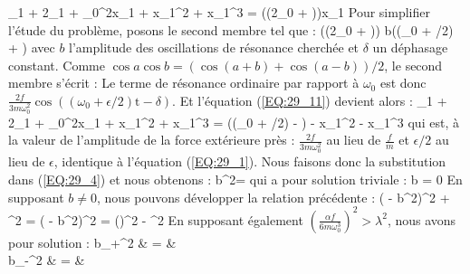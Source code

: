 \be
	_{1} + 2\lambda{}_{1} + \omega_{0}^{2}x_{1} + \alpha x_{1}^{2} + \beta x_{1}^{3} = \cos\left((2\omega_{0} + \epsilon)\right)x_{1} \label{EQ:29_11}
\ee
Pour simplifier l'\'{e}tude du probl\`{e}me, posons le second membre tel que :
\benn
	\cos\left((2\omega_{0} + \epsilon)\right) \times b\cos\left((\omega_{0} + \epsilon/2) + \delta\right)
\eenn
avec $b$ l'amplitude des oscillations de r\'{e}sonance cherch\'{e}e et $\delta$ un d\'{e}phasage constant. Comme $\cos a\cos b = (\cos(a + b) + \cos(a - b))/2$, le second membre s'\'{e}crit :
\benn
\eenn
Le terme de r\'{e}sonance ordinaire par rapport \`{a} $\omega_{0}$ est donc $\frac{2f}{3m\omega_{0}^{2}}\cos\left((\omega_{0} + \epsilon/2)\mathrm{t} - \delta\right)$. Et l'\'{e}quation (\ref{EQ:29_11}) devient alors :
\benn
	_{1} + 2\lambda{}_{1} + \omega_{0}^{2}x_{1} + \alpha x_{1}^{2} + \beta x_{1}^{3} = \cos\left((\omega_{0} + \epsilon/2) - \delta\right) - \alpha x_{1}^{2} - \beta x_{1}^{3}
\eenn
qui est, \`{a} la valeur de l'amplitude de la force ext\'{e}rieure pr\`{e}s : $\frac{2f}{3m\omega_{0}^{2}}$ au lieu de $\frac{f}{m}$ et $\epsilon/2$ au lieu de $\epsilon$, identique \`{a} l'\'{e}quation (\ref{EQ:29_1}). Nous faisons donc la substitution dans (\ref{EQ:29_4}) et nous obtenons :
\benn
	b^{2} = 
\eenn
qui a pour solution triviale :
\be
	b = 0 \label{EQ:29_12}
\ee
En supposant $b \neq 0$, nous pouvons d\'{e}velopper la relation pr\'{e}c\'{e}dente :
\benn
	( - \xi b^{2})^{2} + \lambda^{2} =  \Leftrightarrow ( - \xi b^{2})^{2} = \left(\right)^{2} - \lambda^{2}
\eenn
En supposant \'{e}galement $\left(\frac{\alpha f}{6m\omega_{0}^{3}}\right)^{2} > \lambda^{2}$, nous avons pour solution :
\bea
	b_{+}^{2} & = &  \label{EQ:29_13} \\
	b_{-}^{2} & = &  \label{EQ:29_14}
\eea

